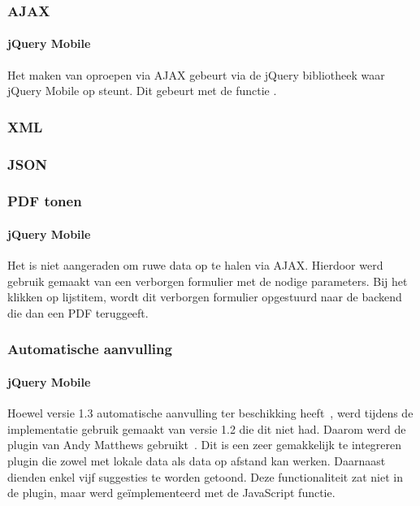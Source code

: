 \subsubsection{AJAX}

\paragraph{jQuery Mobile} 
Het maken van oproepen via AJAX gebeurt via de jQuery bibliotheek waar jQuery Mobile op steunt. Dit gebeurt met de functie . 

\subsubsection{XML}

\subsubsection{JSON}

\subsubsection{PDF tonen}

\paragraph{jQuery Mobile} 
Het is niet aangeraden om ruwe data op te halen via AJAX. Hierdoor werd gebruik gemaakt van een verborgen formulier met de nodige parameters. Bij het klikken op lijstitem, wordt dit verborgen formulier opgestuurd naar de backend die dan een PDF teruggeeft.

\subsubsection{Automatische aanvulling}

\paragraph{jQuery Mobile} 
Hoewel versie 1.3 automatische aanvulling ter beschikking heeft~\cite{JQuery2013c}, werd tijdens de implementatie gebruik gemaakt van versie 1.2 die dit niet had. Daarom werd de plugin van Andy Matthews gebruikt~\cite{Matthews2013}. Dit is een zeer gemakkelijk te integreren plugin die zowel met lokale data als data op afstand kan werken. Daarnaast dienden enkel vijf suggesties te worden getoond. Deze functionaliteit zat niet in de plugin, maar werd geïmplementeerd met de JavaScript  functie.


